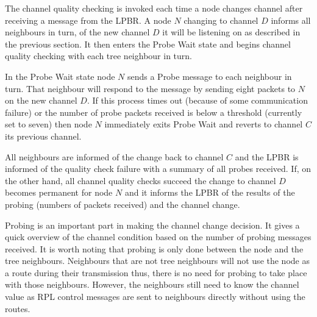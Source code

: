 The channel quality checking is invoked each time a node changes channel after receiving a message from the LPBR. A node $N$ changing to channel $D$ informs all neighbours in turn, of the new channel $D$ it will be listening on as described in the previous section. It then enters the Probe Wait state and begins channel quality checking with each tree neighbour in turn.  

In the Probe Wait state node $N$ sends a Probe message to each neighbour in turn. That neighbour will respond to the message by sending eight packets to $N$ on the new channel $D$. If this process times out (because of some communication failure) or the number of probe packets received is below a threshold (currently set to seven) then node $N$ immediately exits Probe Wait and reverts to channel $C$ its previous channel. 


All neighbours are informed of the change back to channel $C$ and the LPBR is informed of the quality check failure with a summary of all probes received.
If, on the other hand, all channel quality checks succeed the change to channel $D$ becomes permanent for node $N$ and it informs the LPBR of the results of the probing (numbers of packets received) and the channel change.

Probing is an important part in making the channel change decision. It gives a quick overview of the channel condition based on the number of probing messages received. It is worth noting that probing is only done between the node and the tree neighbours. Neighbours that are not tree neighbours will not use the node as a route during their transmission thus, there is no need for probing to take place with those neighbours. However, the neighbours still need to know the channel value as RPL control messages are sent to neighbours directly without using the routes.

